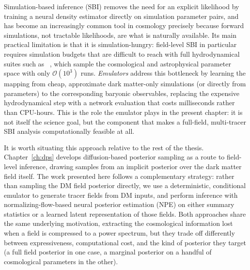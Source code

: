 Simulation-based inference (SBI) removes the need for an explicit
likelihood by training a neural density estimator directly on
simulation parameter pairs, and has become an increasingly common tool in
cosmology precisely because forward simulations, not tractable likelihoods,
are what is naturally available. Its main practical limitation is that it is
simulation-hungry: field-level SBI in particular requires simulation budgets
that are difficult to reach with full hydrodynamical suites such as
\CAMELS~\citep{villaescusa-navarro_camels_2022}, which sample the
cosmological and astrophysical parameter space with only $\mathcal{O}(10^3)$
runs. \emph{Emulators} address this bottleneck by learning the mapping from
cheap, approximate dark matter-only simulations (or directly from
parameters) to the corresponding baryonic observables, replacing the
expensive hydrodynamical step with a network evaluation that costs
milliseconds rather than CPU-hours. This is the role the emulator plays in
the present chapter: it is not itself the science goal, but the component
that makes a full-field, multi-tracer SBI analysis computationally
feasible at all.

It is worth situating this approach relative to the rest of the thesis.
Chapter~\ref{ch:dps} develops diffusion-based posterior sampling as a route
to field-level inference, drawing samples from an implicit posterior over
the dark matter field itself. The work presented here follows a
complementary strategy: rather than sampling the DM field posterior directly,
we use a deterministic, conditional emulator to generate tracer fields from
DM inputs, and perform inference with normalizing-flow-based neural
posterior estimation (NPE) on either summary statistics or a learned latent
representation of those fields. Both approaches share the same underlying
motivation, extracting the cosmological information lost when a field is
compressed to a power spectrum, but they trade off differently between
expressiveness, computational cost, and the kind of posterior they target
(a full field posterior in one case, a marginal posterior on a handful of
cosmological parameters in the other).

